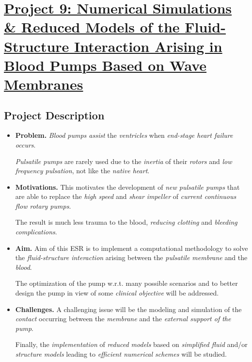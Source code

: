 \documentclass{book}
\numberwithin{equation}{section}
\begin{document}

\chapter{\href{https://www.romsoc.eu/numerical-simulations-and-reduced-models-of-the-fluid-structure-interaction-arising-in-blood-pumps-based-on-wave-membranes/}{Project 9: Numerical Simulations \& Reduced Models of the Fluid-Structure Interaction Arising in Blood Pumps Based on Wave Membranes}}

\section{Project Description}
\begin{itemize}
    \item \textbf{Problem.} \textit{Blood pumps assist} the \textit{ventricles} when \textit{end-stage heart failure occurs}.
    
    \textit{Pulsatile pumps} are rarely used due to the \textit{inertia} of their \textit{rotors} and \textit{low frequency pulsation}, not like the \textit{native heart}.
    \item \textbf{Motivations.} This motivates the development of \textit{new pulsatile pumps} that are able to replace the \textit{high speed} and \textit{shear impeller} of \textit{current continuous flow rotary pumps}.
    
    The result is much less trauma to the blood, \textit{reducing clotting} and \textit{bleeding complications}.
    \item \textbf{Aim.} Aim of this ESR is to implement a computational methodology to solve the \textit{fluid-structure interaction} arising between the \textit{pulsatile membrane} and the \textit{blood}.
    
    The optimization of the pump w.r.t. many possible scenarios and to better design the pump in view of some \textit{clinical objective} will be addressed.
    \item \textbf{Challenges.} A challenging issue will be the modeling and simulation of the \textit{contact} occurring between the \textit{membrane} and the \textit{external support of the pump}.
    
    Finally, the \textit{implementation} of \textit{reduced models} based on \textit{simplified fluid} and/or \textit{structure models} leading to \textit{efficient numerical schemes} will be studied.
\end{itemize}
\end{document}

